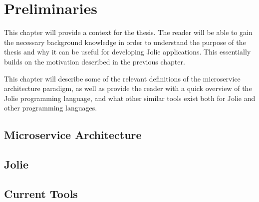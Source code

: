 \chapter{Preliminaries}
This chapter will provide a context for the thesis.
The reader will be able to gain the necessary background knowledge in order
to understand the purpose of the thesis and why it can be useful for developing Jolie applications. This essentially builds on the motivation
described in the previous chapter.

This chapter will describe some of the relevant definitions of the microservice architecture paradigm, as well as provide
the reader with a quick overview of the Jolie programming language, and what other similar tools exist both for Jolie and other programming languages.

\section{Microservice Architecture}

\section{Jolie}

\section{Current Tools}
